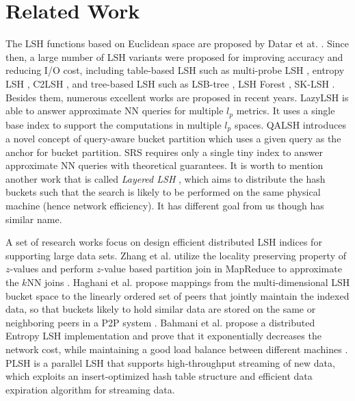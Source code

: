 \section{Related Work}
\label{sec:related}

 The LSH functions based on Euclidean space are proposed by Datar et at. \cite{datar}. Since then, a large number of LSH variants were proposed for improving accuracy and reducing I/O cost, including table-based LSH such as multi-probe LSH \cite{mplsh}, entropy LSH \cite{Panigrahy:2006:EBN:1109557.1109688}, C2LSH \cite{c2lsh}, and tree-based LSH such as LSB-tree \cite{lsb}, LSH Forest \cite{Bawa:2005:LFS:1060745.1060840}, SK-LSH \cite{sklsh}. Besides them, numerous excellent works are proposed in recent years. LazyLSH \cite{Zheng:2016:LAN:2882903.2882930} is able to answer approximate NN queries for multiple $l_p$ metrics. It uses a single base index to support the computations in multiple $l_p$ spaces. QALSH \cite{Huang:2015:QLH:2850469.2850470} introduces a novel concept of query-aware bucket partition which uses a given query as the anchor for bucket partition. SRS \cite{srs} requires only a single tiny index to answer approximate NN queries with theoretical guarantees. It is worth to mention another work that is called \emph{Layered LSH} \cite{distlsh}, which aims to distribute the hash buckets such that the search is likely to be performed on the same physical machine (hence network efficiency). It has different goal from us though has similar name.


 A set of research works focus on design efficient distributed LSH indices for supporting large data sets. Zhang et al. utilize the locality preserving property of $z$-values and perform $z$-value based partition join in MapReduce to approximate the $k$NN joins \cite{Zhang:2012:EPK:2247596.2247602}. Haghani et al. propose mappings from the multi-dimensional LSH bucket space to the linearly ordered set of peers that jointly maintain the indexed data, so that buckets likely to hold similar data are stored on the same or neighboring peers in a P2P system \cite{Haghani:2009:DSS:1516360.1516446}. Bahmani et al. propose a distributed Entropy LSH implementation and prove that it exponentially decreases the network cost, while maintaining a good load balance between different machines \cite{distlsh}. PLSH \cite{Sundaram:2013:SSS:2556549.2556574} is a parallel LSH that supports high-throughput streaming of new data, which exploits an insert-optimized hash table structure and efficient data expiration algorithm for streaming data.

